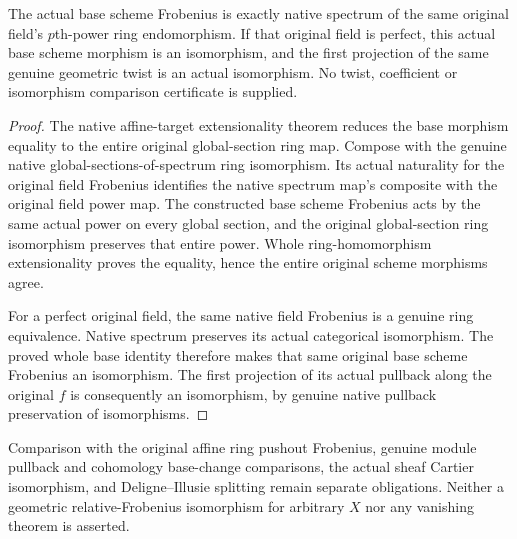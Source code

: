 \begin{theorem}
\label{lem:cartier-original-relative-frobenius-base-identification}
\leanok
The actual base scheme Frobenius is exactly native spectrum of the
same original field's $p$th-power ring endomorphism. If that original
field is perfect, this actual base scheme morphism is an isomorphism,
and the first projection of the same genuine geometric twist is an
actual isomorphism. No twist, coefficient or isomorphism comparison
certificate is supplied.
\end{theorem}
\begin{proof}
The native affine-target extensionality theorem reduces the base
morphism equality to the entire original global-section ring map.
Compose with the genuine native global-sections-of-spectrum ring
isomorphism. Its actual naturality for the original field Frobenius
identifies the native spectrum map's composite with the original
field power map. The constructed base scheme Frobenius
acts by the same actual power on every global section, and the
original global-section ring isomorphism preserves that entire power.
Whole ring-homomorphism extensionality proves the equality, hence
the entire original scheme morphisms agree.

For a perfect original field, the same native field Frobenius is a
genuine ring equivalence. Native spectrum preserves its actual
categorical isomorphism. The proved whole base identity therefore
makes that same original base scheme Frobenius an isomorphism.
The first projection of its actual pullback along the original $f$
is consequently an isomorphism, by genuine native pullback
preservation of isomorphisms.
\end{proof}

Comparison with the original affine ring pushout Frobenius, genuine
module pullback and cohomology base-change comparisons, the actual
sheaf Cartier isomorphism, and Deligne--Illusie splitting remain
separate obligations. Neither a geometric relative-Frobenius
isomorphism for arbitrary $X$ nor any vanishing theorem is asserted.
